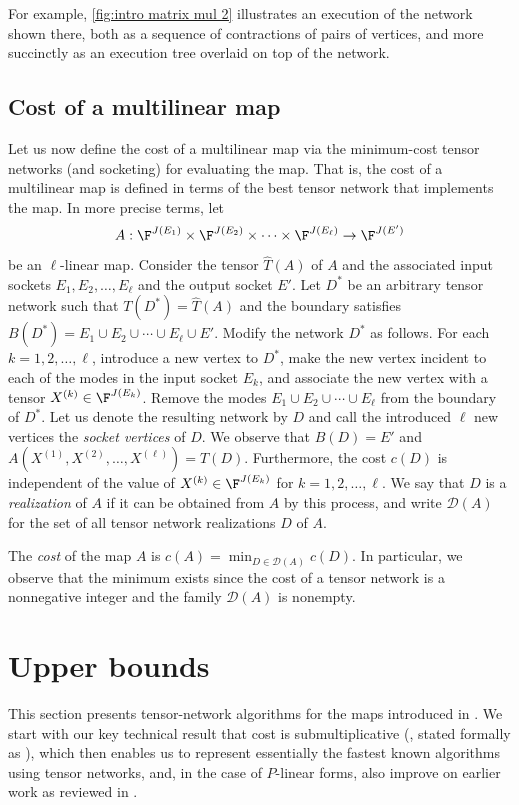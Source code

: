 For example, \eqref{fig:intro matrix mul 2} illustrates an execution
of the network shown there, both as a sequence of contractions of
pairs of vertices, and more succinctly as an execution tree overlaid
on top of the network.

\subsection{Cost of a multilinear map}
\label{sec:map cost}

Let us now define the cost of a multilinear map via the minimum-cost
tensor networks (and socketing) for evaluating the map.
That is, the cost of a multilinear map is defined in
terms of the best tensor network that implements the map.
In more precise terms, let
\[
A:\F^{J(E_1)}\times\F^{J(E_2)}\times\cdots \times\F^{J(E_\ell)}
      \rightarrow \F^{J(E')}
\]
be an $\ell$-linear map. Consider the tensor $\hat{T}(A)$ of $A$ and the
associated input sockets $E_1,E_2,\ldots,E_\ell$ and the output socket
$E'$. Let $D^*$ be an arbitrary tensor network such that $T(D^*)=\hat{T}(A)$ and
the boundary satisfies $B(D^*) =E_1\cup E_2\cup\cdots\cup E_\ell\cup E'$.
Modify the network $D^*$ as follows.
For each $k=1,2,\ldots,\ell$, introduce a new vertex to $D^*$,
make the new vertex incident to each of the modes in the input socket $E_k$,
and associate the new vertex with a tensor $X^{(k)}\in\F^{J(E_k)}$.
Remove the modes $E_1\cup E_2\cup\cdots\cup E_\ell$ from the boundary of $D^*$.
Let us denote the resulting network by $D$ and call the introduced $\ell$
new vertices the \emph{socket vertices} of $D$.
We observe that $B(D)=E'$ and $A(X^{(1)},X^{(2)},\ldots,X^{(\ell)})=T(D)$.
Furthermore, the cost $c(D)$ is independent of the value of
$X^{(k)}\in\F^{J(E_k)}$ for $k=1,2,\ldots,\ell$.
We say that $D$ is a \emph{realization} of $A$ if it can be obtained
from $A$ by this process, and write $\mathscr{D}(A)$ for the set of all
tensor network realizations $D$ of $A$.

The \emph{cost} of the map $A$ is
$c(A)=\min_{D\in\mathscr{D}(A)} c(D)$.
In particular, we observe that the minimum exists since the cost of a
tensor network is a nonnegative integer and the family $\mathscr{D}(A)$
is nonempty.

\section{Upper bounds}
\label{sec:upper bounds}

This section presents tensor-network algorithms for the maps
introduced in . We start with our key technical result
that cost is submultiplicative (,
stated formally as ),
which then enables us to represent essentially the fastest known algorithms
using tensor networks, and, in the case of $P$-linear forms, also
improve on earlier work as reviewed in .

